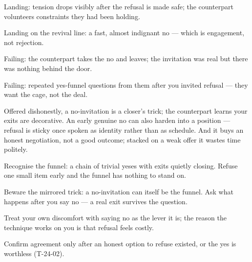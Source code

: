 \begin{feedback}
  \item Landing: tension drops visibly after the refusal is made safe; the counterpart volunteers constraints they had been holding.
  \item Landing on the revival line: a fast, almost indignant no --- which is engagement, not rejection.
  \item Failing: the counterpart takes the no and leaves; the invitation was real but there was nothing behind the door.
  \item Failing: repeated yes-funnel questions from them after you invited refusal --- they want the cage, not the deal.
\end{feedback}
\begin{failure}
Offered dishonestly, a no-invitation is a closer's trick; the counterpart learns your exits are decorative. An early genuine no can also harden into a position --- refusal is sticky once spoken as identity rather than as schedule. And it buys an honest negotiation, not a good outcome; stacked on a weak offer it wastes time politely.
\end{failure}
\begin{countermeasures}
  \item Recognise the funnel: a chain of trivial yeses with exits quietly closing. Refuse one small item early and the funnel has nothing to stand on.
  \item Beware the mirrored trick: a no-invitation can itself be the funnel. Ask what happens after you say no --- a real exit survives the question.
  \item Treat your own discomfort with saying no as the lever it is; the reason the technique works on you is that refusal feels costly.
  \item Confirm agreement only after an honest option to refuse existed, or the yes is worthless (T-24-02).
\end{countermeasures}

\seesources
{}
